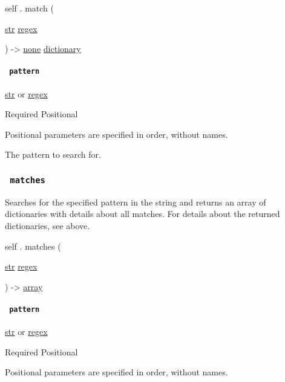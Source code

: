 self { . } { match } (

{ \href{/docs/reference/foundations/str/}{str}
\href{/docs/reference/foundations/regex/}{regex} }

) -\textgreater{} \href{/docs/reference/foundations/none/}{none}
\href{/docs/reference/foundations/dictionary/}{dictionary}

\paragraph{\texorpdfstring{\texttt{\ pattern\ }}{ pattern }}\label{definitions-match-pattern}

\href{/docs/reference/foundations/str/}{str} {or}
\href{/docs/reference/foundations/regex/}{regex}

{Required} {{ Positional }}

\label{definitions-match-pattern-positional-tooltip}
Positional parameters are specified in order, without names.

The pattern to search for.

\subsubsection{\texorpdfstring{\texttt{\ matches\ }}{ matches }}\label{definitions-matches}

Searches for the specified pattern in the string and returns an array of
dictionaries with details about all matches. For details about the
returned dictionaries, see above.

self { . } { matches } (

{ \href{/docs/reference/foundations/str/}{str}
\href{/docs/reference/foundations/regex/}{regex} }

) -\textgreater{} \href{/docs/reference/foundations/array/}{array}

\paragraph{\texorpdfstring{\texttt{\ pattern\ }}{ pattern }}\label{definitions-matches-pattern}

\href{/docs/reference/foundations/str/}{str} {or}
\href{/docs/reference/foundations/regex/}{regex}

{Required} {{ Positional }}

\label{definitions-matches-pattern-positional-tooltip}
Positional parameters are specified in order, without names.

